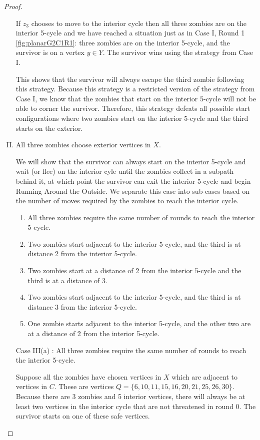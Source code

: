 \begin{proof}
\begin{enumerate}[I.]
If $z_3$ chooses to move to the interior cycle then all three zombies are on the interior 5-cycle and we have reached a situation just as in Case I, Round 1 \ref{fig:planarG2C1R1}: three zombies are on the interior 5-cycle, and the survivor is on a vertex $y\in Y$. The survivor wins using the strategy from Case I.

This shows that the survivor will always escape the third zombie following this strategy. Because this strategy is a restricted version of the strategy from
Case I, we know that the zombies that start on the interior 5-cycle will not be able to corner the survivor. Therefore, this strategy defeats all possible
start configurations where two zombies start on the interior 5-cycle and the third starts on the exterior.

\item All three zombies choose exterior vertices in $X$.\label{planar case 3}

We will show that the survivor can always start on the interior 5-cycle and wait (or flee) on the interior cyle until the zombies collect in a subpath behind it, at which point the survivor can exit the interior 5-cycle and begin Running Around the Outside. We separate this case into sub-cases based on the number of moves required by the zombies to reach the interior cycle.

\begin{enumerate}
  \item All three zombies require the same number of rounds to reach the interior 5-cycle.
  \item Two zombies start adjacent to the interior 5-cycle, and the third is at distance 2 from the interior 5-cycle.
  \item Two zombies start at a distance of 2 from the interior 5-cycle and the third is at a distance of 3.
  \item Two zombies start adjacent to the interior 5-cycle, and the third is at distance 3 from the interior 5-cycle.
  \item One zombie starts adjacent to the interior 5-cycle, and the other two are at a distance of 2 from the interior 5-cycle.
\end{enumerate}


\item[Case III(a)]: All three zombies require the same number of rounds to reach the interior 5-cycle.

Suppose all the zombies have chosen vertices in $X$ which are adjacent to vertices in $C$. These are vertices $Q = \{6, 10, 11, 15, 16, 20, 21, 25, 26, 30 \}$.
Because there are 3 zombies and 5 interior vertices, there will always be at least two vertices in the interior cycle that are not threatened in
round 0. The survivor starts on one of these safe vertices.


\end{enumerate}
\end{proof}
